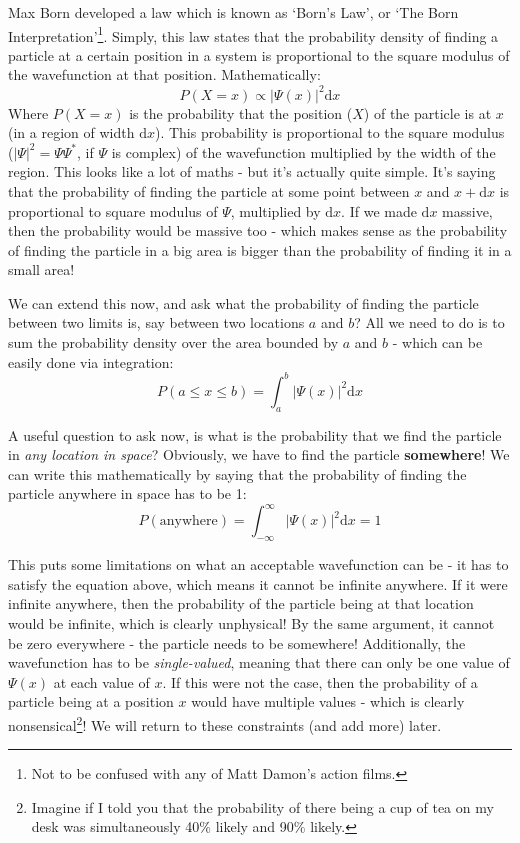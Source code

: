 \documentclass{memoir}[11pt,oneside,a4paper,openany]
\newcommand{\wf}{\ensuremath{\Psi}\xspace}
\begin{document}
Max Born developed a law which is known as `Born's Law', or `The Born Interpretation'\footnote{Not to be confused with any of Matt Damon's action films.}. Simply, this law states that the probability density of finding a particle at a certain position in a system is proportional to the square modulus of the wavefunction at that position. Mathematically:
\begin{equation}
	P(X=x) \propto \lvert \wf(x) \rvert ^2 \mathrm{d}x 
\end{equation}
Where $P(X=x)$ is the probability that the position ($X$) of the particle is at $x$ (in a region of width $\mathrm{d}x$). This probability is proportional to the square modulus ($\lvert \wf \rvert ^2 = \wf \wf^*$, if $\wf$ is complex) of the wavefunction multiplied by the width of the region. This looks like a lot of maths - but it's actually quite simple. It's saying that the probability of finding the particle at some point between $x$ and $x+\mathrm{d}x$ is proportional to square modulus of \wf, multiplied by $\mathrm{d}x$. If we made $\mathrm{d}x$ massive, then the probability would be massive too - which makes sense as the probability of finding the particle in a big area is bigger than the probability of finding it in a small area! 

We can extend this now, and ask what the probability of finding the particle between two limits is, say between two locations $a$ and $b$? All we need to do is to sum the probability density over the area bounded by $a$ and $b$ - which can be easily done via integration:
\begin{equation}
	P(a\leq x \leq b) = \int_a^b \lvert \wf(x) \rvert ^2 \mathrm{d}x
\end{equation}

A useful question to ask now, is what is the probability that we find the particle in \emph{any location in space}? Obviously, we have to find the particle \textbf{somewhere}! We can write this mathematically by saying that the probability of finding the particle anywhere in space has to be 1:
\begin{equation}\label{eq:normalisation}
	P(\text{anywhere}) = \int_{-\infty}^{\infty} \lvert \wf(x) \rvert ^2 \mathrm{d}x = 1
\end{equation}

This puts some limitations on what an acceptable wavefunction can be - it has to satisfy the equation above, which means it cannot be infinite anywhere. If it were infinite anywhere, then the probability of the particle being at that location would be infinite, which is clearly unphysical! By the same argument, it cannot be zero everywhere - the particle needs to be somewhere! Additionally, the wavefunction has to be \emph{single-valued}, meaning that there can only be one value of $\wf(x)$ at each value of $x$. If this were not the case, then the probability of a particle being at a position $x$ would have multiple values - which is clearly nonsensical\footnote{Imagine if I told you that the probability of there being a cup of tea on my desk was simultaneously 40\% likely and 90\% likely.}! We will return to these constraints (and add more) later.
\end{document}
